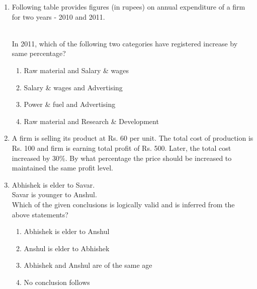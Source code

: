 \documentclass[journal,12pt,onecolumn]{IEEEtran}
\theoremstyle{remark}
\begin{document}
\begin{enumerate}
\begin{enumerate}
\end{enumerate}
\item Following table provides figures (in rupees) on annual expenditure of a firm for two years - 2010
and 2011.
\begin{table}[h]
    \centering
    
\end{table}\\
In 2011, which of the following two categories have registered increase by same percentage?
\begin{enumerate}
\item Raw material and Salary \& wages
\item Salary \& wages and Advertising
\item Power \& fuel and Advertising
\item Raw material and Research \& Development
\end{enumerate}
\item A firm is selling its product at Rs. 60 per unit. The total cost of production is Rs. 100 and firm is
earning total profit of Rs. 500. Later, the total cost increased by 30\%. By what percentage the price
should be increased to maintained the same profit level.
\begin{enumerate}
\end{enumerate}
\item Abhishek is elder to Savar.\\
Savar is younger to Anshul.\\
Which of the given conclusions is logically valid and is inferred from the above
statements?
\begin{enumerate}
\item Abhishek is elder to Anshul
\item Anshul is elder to Abhishek
\item Abhishek and Anshul are of the same age
\item No conclusion follows
\end{enumerate}
\end{enumerate}
\end{document}
